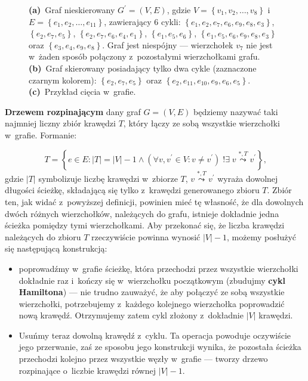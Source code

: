 \begin{figure}[!htbp]
\begin{subfigure}[b]{0.32\textwidth}
		\caption{}
		\label{fig:defExample:c}
	\end{subfigure}
	\hfill\null
	\caption{
		\textbf{(a)}~Graf nieskierowany $G^{\prime} = \left( V, E \right)$, gdzie $V = \left\{ v_{1}, v_{2}, \dots, v_{8} \right\}$ i~$E = \left\{ e_{1}, e_{2}, \dots, e_{11} \right\}$, zawierający $6$ cykli: $\left\{ e_{1}, e_{2}, e_{7}, e_{6}, e_{9}, e_{8}, e_{3} \right\}$, $\left\{ e_{2}, e_{7}, e_{5} \right\}$, $\left\{ e_{2}, e_{7}, e_{6}, e_{4}, e_{1} \right\}$, $\left\{ e_{1}, e_{5}, e_{6} \right\}$, $\left\{ e_{1}, e_{5}, e_{6}, e_{9}, e_{8}, e_{3} \right\}$ oraz $\left\{ e_{3}, e_{4}, e_{9}, e_{8} \right\}$.
		Graf jest niespójny --- wierzchołek $v_{7}$ nie jest w~żaden sposób połączony z~pozostałymi wierzchołkami grafu.
		\textbf{(b)}~Graf skierowany posiadający tylko dwa cykle (zaznaczone czarnym kolorem): $\left\{ e_{2}, e_{7}, e_{5} \right\}$ oraz $\left\{ e_{2}, e_{11}, e_{10}, e_{9}, e_{6}, e_{5} \right\}$.
		\textbf{(c)}~Przykład cięcia w~grafie.
	}
	\label{fig:defExample}
\end{figure}

\textbf{Drzewem rozpinającym} dany graf $G = \left( V, E \right)$ będziemy nazywać taki najmniej liczny zbiór krawędzi $T$, który łączy ze sobą wszystkie wierzchołki w~grafie.
Formanie:

\begin{equation}
	T = \left\{ e \in E : \left| T \right| = \left| V \right| - 1 \wedge \left( \forall v, v^{\prime} \in V : v \neq v^{\prime} \right) \; !\exists \; v \overset{\ast, T}{\leadsto} v^{\prime} \right\}\text{,}
\end{equation}
gdzie $\left| T \right|$ symbolizuje liczbę krawędzi w~zbiorze $T$, $v \overset{\ast, T}{\leadsto} v^{\prime}$ wyraża dowolnej długości ścieżkę, składającą się tylko z~krawędzi generowanego zbioru $T$.
Zbiór ten, jak widać z~powyższej definicji, powinien mieć tę własność, że dla dowolnych dwóch różnych wierzchołków, należących do grafu, istnieje dokładnie jedna ścieżka pomiędzy tymi wierzchołkami.
Aby przekonać się, że liczba krawędzi należących do zbioru $T$ rzeczywiście powinna wynosić $\left| V \right| - 1$, możemy posłużyć się następującą konstrukcją:

\begin{itemize}
	\item poprowadźmy w~grafie ścieżkę, która przechodzi przez wszystkie wierzchołki dokładnie raz i~kończy się w~wierzchołku początkowym (zbudujmy \textbf{cykl Hamiltona}) --- nie trudno zauważyć, że aby połączyć ze sobą wszystkie wierzchołki, potrzebujemy z~każdego kolejnego wierzchołka poprowadzić nową krawędź.
	Otrzymujemy zatem cykl złożony z~dokładnie $\left| V \right|$ krawędzi.
	\item Usuńmy teraz dowolną krawędź z~cyklu.
	Ta operacja powoduje oczywiście jego przerwanie, zaś ze sposobu jego konstrukcji wynika, że pozostała ścieżka przechodzi kolejno przez wszystkie węzły w~grafie --- tworzy drzewo rozpinające o~liczbie krawędzi równej $\left| V \right| - 1$.
\end{itemize}




